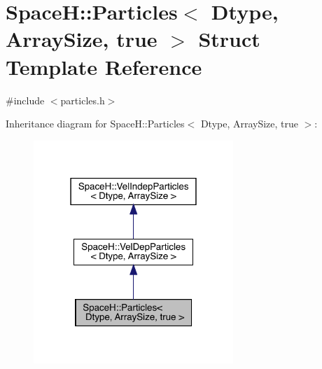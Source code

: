 \hypertarget{struct_space_h_1_1_particles_3_01_dtype_00_01_array_size_00_01true_01_4}{}\section{SpaceH\+:\+:Particles$<$ Dtype, Array\+Size, true $>$ Struct Template Reference}
\label{struct_space_h_1_1_particles_3_01_dtype_00_01_array_size_00_01true_01_4}


{\ttfamily \#include $<$particles.\+h$>$}



Inheritance diagram for SpaceH\+:\+:Particles$<$ Dtype, Array\+Size, true $>$\+:
\nopagebreak
\begin{figure}[H]
\begin{center}
\leavevmode
\includegraphics[width=214pt]{struct_space_h_1_1_particles_3_01_dtype_00_01_array_size_00_01true_01_4__inherit__graph}
\end{center}
\end{figure}


